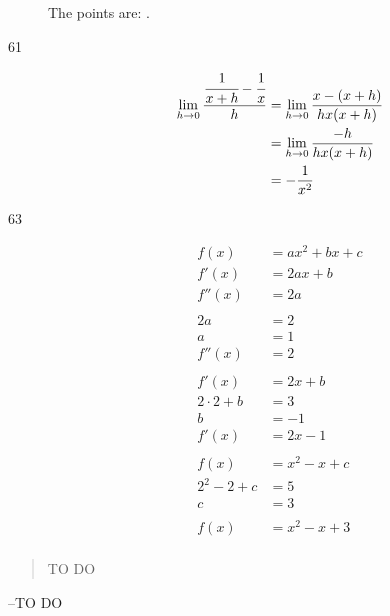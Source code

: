\documentclass[letterpaper, landscape]{exam}
\begin{document}
\begin{description}
      The points are: .

    \item[61]
      \begin{align*}
        \lim_{h \to 0} \frac{\cfrac{1}{x + h} - \cfrac{1}{x}}{h} & = \lim_{h \to 0} \frac{x - (x + h)}{hx(x + h)} \\
                                                                 & = \lim_{h \to 0} \frac{-h}{hx(x + h)} \\
                                                                 & = - \frac{1}{x^2} \\
      \end{align*}

    \item[63]
      \begin{align*}
        f(x)          & = ax^2 + bx + c \\
        f'(x)         & = 2ax + b \\
        f''(x)        & = 2a \\
        \\
        2a            & = 2 \\
        a             & = 1 \\
        f''(x)        &= 2 \\
        \\
        f'(x)         & = 2x + b \\
        2 \cdot 2 + b & = 3 \\
        b             & = -1 \\
        f'(x)         & = 2x - 1 \\
        \\
        f(x)          & = x^2 - x + c \\
        2^2 - 2 + c   & = 5 \\
        c             & = 3 \\
        \\
        f(x)          & = \boxed{ x^2 - x + 3 } \\
      \end{align*}
   \end{description}
 
  \else
    \vspace{10 cm}
    \begin{quote}
      \begin{em}
        TO DO
      \end{em}
    \end{quote}
    \hspace{2 cm} --TO DO
  \fi
\end{document}
